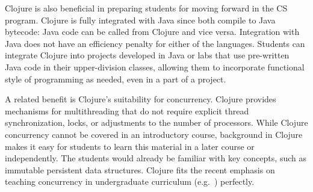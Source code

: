 \documentclass[submission,copyright,creativecommons]{eptcs}
\newcommand{\allcomments}[1]{{#1}}
\newcommand{\elenacomment}[1]{{\bf \textcolor{ForestGreen}{\allcomments{{#1}}}}}
\newcommand{\stephencomment}[1]{{\bf \color{StephensBlue}{\allcomments{{#1}}}}} %
\newcommand{\joecomment}[1]{{\bf \color{JoesGold}{\allcomments{{#1}}}}}
\begin{document}
Clojure is also beneficial in preparing students for moving forward in the CS program. 
Clojure is fully integrated with Java since both compile to Java bytecode: Java code can be called from Clojure and vice versa.
Integration with Java does not have an efficiency penalty for either of the languages. 
Students can  integrate Clojure into projects developed in Java or labs that use pre-written Java code in their upper-division classes, allowing them to incorporate functional style of programming as needed, even in a part of a project. 

A related benefit is Clojure's suitability for concurrency. Clojure provides mechanisms for multithreading that do not require explicit thread synchronization,  locks, 
or adjustments to the number of processors. While Clojure concurrency cannot be  covered in an introductory course, background in Clojure makes it easy for students to learn this material in a later course or independently.%
The students would already be familiar with key concepts, such as immutable persistent data structures. Clojure fits the recent 
emphasis on teaching concurrency in undergraduate curriculum (e.g.~\cite{Brown:2010}) perfectly. 
\end{document}
